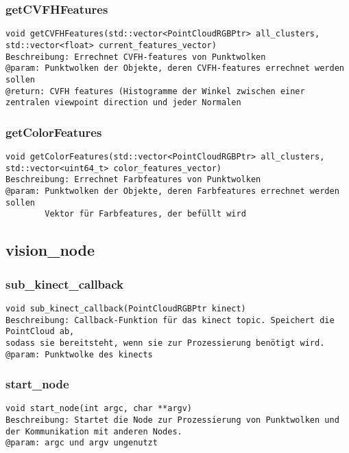 \documentclass{suturo}
\begin{document}
\subsubsection{getCVFHFeatures}
\begin{verbatim}
void getCVFHFeatures(std::vector<PointCloudRGBPtr> all_clusters, std::vector<float> current_features_vector)
Beschreibung: Errechnet CVFH-features von Punktwolken
@param: Punktwolken der Objekte, deren CVFH-features errechnet werden sollen
@return: CVFH features (Histogramme der Winkel zwischen einer zentralen viewpoint direction und jeder Normalen
\end{verbatim}\label{func:getcvfhfeatures}

\subsubsection{getColorFeatures}
\begin{verbatim}
void getColorFeatures(std::vector<PointCloudRGBPtr> all_clusters, std::vector<uint64_t> color_features_vector)
Beschreibung: Errechnet Farbfeatures von Punktwolken
@param: Punktwolken der Objekte, deren Farbfeatures errechnet werden sollen
	    Vektor für Farbfeatures, der befüllt wird
\end{verbatim}\label{func:getcolorfeatures}


\subsection*{vision\_node}
\subsubsection{sub\_kinect\_callback}
\begin{verbatim}
void sub_kinect_callback(PointCloudRGBPtr kinect)
Beschreibung: Callback-Funktion für das kinect topic. Speichert die PointCloud ab,
sodass sie bereitsteht, wenn sie zur Prozessierung benötigt wird.
@param: Punktwolke des kinects
\end{verbatim}\label{func:subkinectcallback}
\subsubsection{start\_node}
\begin{verbatim}
void start_node(int argc, char **argv)
Beschreibung: Startet die Node zur Prozessierung von Punktwolken und der Kommunikation mit anderen Nodes.
@param: argc und argv ungenutzt
\end{verbatim}\label{func:startnode}
\end{document}
